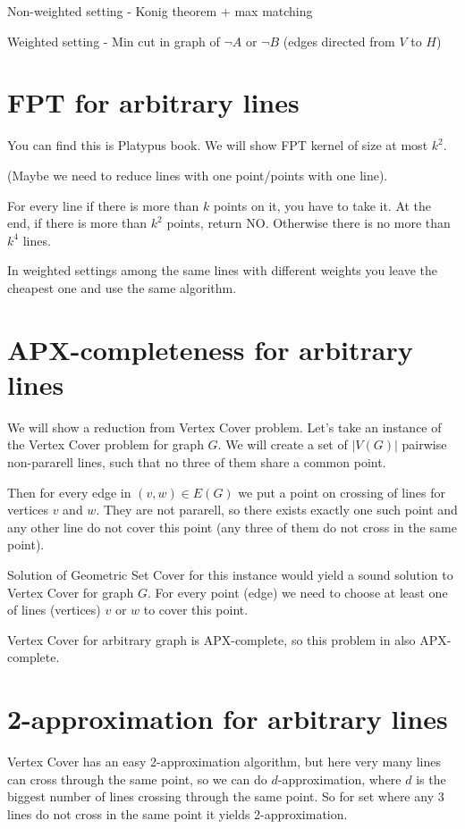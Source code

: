 \documentclass[en]{pracamgr}
\theoremstyle{plain}
\theoremstyle{definition}
\begin{document}
Non-weighted setting - Konig theorem + max matching

Weighted setting - Min cut in graph of $\neg A$ or $\neg B$
(edges directed from $V$ to $H$)

\section{FPT for arbitrary lines}
You can find this is Platypus book.
We will show FPT kernel of size at most $k^2$.

(Maybe we need to reduce lines with one point/points with one line).

For every line if there is more than $k$ points on it,
you have to take it. At the end, if there is more than $k^2$ points,
return NO.
Otherwise there is no more than $k^4$ lines.

In weighted settings among the same lines with different weights
you leave the cheapest one and use the same algorithm.

\section{APX-completeness for arbitrary lines}
We will show a reduction from Vertex Cover problem.
Let's take an instance of the Vertex Cover problem for graph $G$.
We will create a set of $|V(G)|$ pairwise non-pararell lines,
such that no three of them share a common point.

Then for every edge in $(v, w) \in E(G)$
we put a point on crossing of lines for vertices $v$ and $w$.
They are not pararell, so there exists exactly one such point
and any other line do not cover this point (any three of them do not
cross in the same point).

Solution of Geometric Set Cover for this instance would yield
a sound solution to Vertex Cover for graph $G$.
For every point (edge) we need to choose at least one of
lines (vertices) $v$ or $w$ to cover this point.

Vertex Cover for arbitrary graph is APX-complete,
so this problem in also APX-complete.

\section{2-approximation for arbitrary lines}
Vertex Cover has an easy 2-approximation algorithm,
but here very many lines can cross through
the same point, so we can do $d$-approximation,
where $d$ is the biggest number of lines crossing through the same point.
So for set where any 3 lines do not cross in the same point
it yields 2-approximation.
\end{document}
